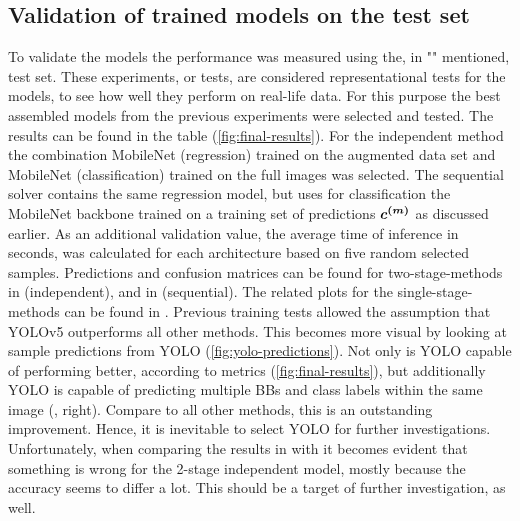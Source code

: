 \subsection{Validation of trained models on the test set}\label{subsec:validation-of-trained-models}
To validate the models the performance was measured using the, in "" mentioned, test set.
These experiments, or tests, are considered representational tests for the models, to see how well they perform on real-life data.
For this purpose the best assembled models from the previous experiments were selected and tested.
The results can be found in the table (\ref{fig:final-results}).
For the independent method the combination MobileNet (regression) trained on the augmented data set and MobileNet (classification) trained on the full images was selected.
The sequential solver contains the same regression model, but uses for classification the MobileNet backbone trained on a training set of predictions $\bm{c^{(m)}}$ as discussed earlier.
As an additional validation value, the average time of inference in seconds, was calculated for each architecture based on five random selected samples.
Predictions and confusion matrices can be found for two-stage-methods in  (independent), and in  (sequential).
The related plots for the single-stage-methods can be found in .
Previous training tests allowed the assumption that YOLOv5 outperforms all other methods.
This becomes more visual by looking at sample predictions from YOLO (\ref{fig:yolo-predictions}).
Not only is YOLO capable of performing better, according to metrics (\ref{fig:final-results}), but additionally YOLO is capable of predicting multiple BBs and class labels within the same image (, right).
Compare to all other methods, this is an outstanding improvement.
Hence, it is inevitable to select YOLO for further investigations.
Unfortunately, when comparing the results in  with  it becomes evident that something is wrong for the 2-stage independent model, mostly because the accuracy seems to differ a lot.
This should be a target of further investigation, as well.

